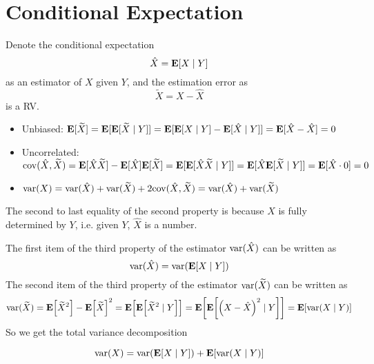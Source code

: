 \documentclass[device=normal, lang=en]{elegantbook}
\numberwithin{equation}{section}
\begin{document}
\section{Conditional Expectation}
\begin{theorem}
    Denote the conditional expectation
    \begin{equation}
        \hat{X} = \mathbf{E}[X \mid Y]
    \end{equation}
    as an estimator of $X$ given $Y$, and the estimation error as 
    \begin{equation}
        \widetilde{X} = X - \hat{X}
    \end{equation}
    is a RV.
\end{theorem}
\begin{property}
    \begin{itemize}
        \item Unbiased: $\mathbf{E}[\widetilde{X}] = \mathbf{E}[\mathbf{E}[\widetilde{X} \mid Y]] = \mathbf{E}[\mathbf{E}[X \mid Y] - \mathbf{E}[\hat{X} \mid Y]] = \mathbf{E}[\hat{X} - \hat{X}] = 0$
        \item Uncorrelated: $\mathrm{cov}(\hat{X}, \widetilde{X}) = \mathbf{E}[\hat{X}\widetilde{X}] - \mathbf{E}[\hat{X}]\mathbf{E}[\widetilde{X}] = \mathbf{E}[\mathbf{E}[\hat{X}\widetilde{X} \mid Y]] = \mathbf{E}[\hat{X}\mathbf{E}[\widetilde{X} \mid Y]] = \mathbf{E}[\hat{X} \cdot 0] = 0$
        \item $\mathrm{var}(X) = \mathrm{var}(\hat{X}) + \mathrm{var}(\widetilde{X}) + 2\mathrm{cov}(\hat{X}, \widetilde{X}) = \mathrm{var}(\hat{X}) + \mathrm{var}(\widetilde{X})$
    \end{itemize}
    The second to last equality of the second property is because $\hat{X}$ is fully determined by $Y$, i.e. given $Y$, $\hat{X}$ is a number.
\end{property}

The first item of the third property of the estimator $\mathrm{var}(\hat{X})$ can be written as 
\begin{equation}
    \mathrm{var}(\hat{X}) = \mathrm{var}\qty(\mathbf{E}[X \mid Y])
\end{equation}
The second item of the third property of the estimator $\mathrm{var}(\widetilde{X})$ can be written as
\begin{equation}
    \mathrm{var}(\widetilde{X}) = \mathbf{E}\qty[\widetilde{X}^2] - \mathbf{E}\qty[\widetilde{X}]^2 = \mathbf{E}\qty[\mathbf{E}\qty[\widetilde{X}^2 \mid Y]] = \mathbf{E}\qty[\mathbf{E}\qty[\qty(X - \hat{X})^2 \mid Y]] = \mathbf{E}[\mathrm{var}(X \mid Y)]
\end{equation}
So we get the total variance decomposition
\begin{theorem}
    \begin{equation}
        \mathrm{var}(X) = \mathrm{var}\qty(\mathbf{E}[X \mid Y]) + \mathbf{E}\qty[\mathrm{var}(X \mid Y)]
    \end{equation}
\end{theorem}


\appendix

\end{document}
